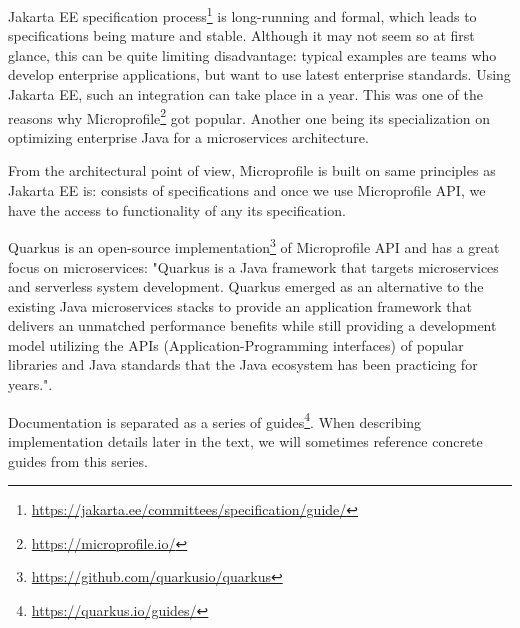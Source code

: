 \documentclass[../main.tex]{subfiles}
\begin{document}
Jakarta EE specification process\footnote{\url{https://jakarta.ee/committees/specification/guide/}} is long-running and formal, which leads to specifications being mature and stable. Although it may not seem so at first glance, this can be quite limiting disadvantage: typical examples are teams who develop enterprise applications, but want to use latest enterprise standards. Using Jakarta EE, such an integration can take place in a year. This was one of the reasons why Microprofile\footnote{\url{https://microprofile.io/}} got popular. Another one being its specialization on optimizing enterprise Java for a microservices architecture.

From the architectural point of view, Microprofile is built on same principles as Jakarta EE is: consists of specifications and once we use Microprofile API, we have the access to functionality of any its specification.

Quarkus is an open-source implementation\footnote{\url{https://github.com/quarkusio/quarkus}} of Microprofile API and has a great focus on microservices: "Quarkus is a Java framework that targets microservices and serverless system
development. Quarkus emerged as an alternative to the existing Java
microservices stacks to provide an application framework that delivers an
unmatched performance benefits while still providing a development model
utilizing the APIs (Application-Programming interfaces) of popular libraries
and Java standards that the Java ecosystem has been practicing for years."\cite{quarkusinaction}\cite{quarkusBook}.

Documentation is separated as a series of guides\footnote{\url{https://quarkus.io/guides/}}. When describing implementation details later in the text, we will sometimes reference concrete guides from this series.
\end{document}
